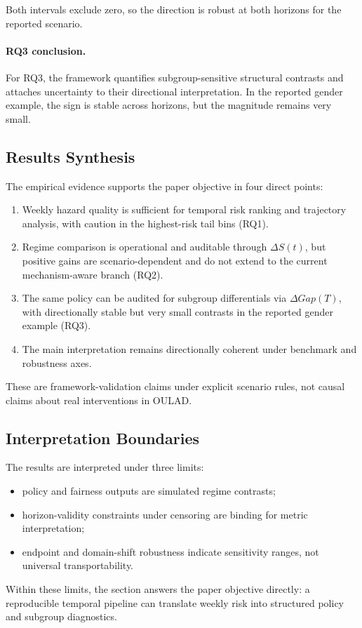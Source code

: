 Both intervals exclude zero, so the direction is robust at both horizons for the reported scenario.

\paragraph*{RQ3 conclusion.}
For RQ3, the framework quantifies subgroup-sensitive structural contrasts and attaches uncertainty to their directional interpretation. In the reported gender example, the sign is stable across horizons, but the magnitude remains very small.

\subsection{Results Synthesis}
\label{subsec:results_synthesis}

The empirical evidence supports the paper objective in four direct points:

\begin{enumerate}
\item Weekly hazard quality is sufficient for temporal risk ranking and trajectory analysis, with caution in the highest-risk tail bins (RQ1).
\item Regime comparison is operational and auditable through $\Delta S(t)$, but positive gains are scenario-dependent and do not extend to the current mechanism-aware branch (RQ2).
\item The same policy can be audited for subgroup differentials via $\Delta Gap(T)$, with directionally stable but very small contrasts in the reported gender example (RQ3).
\item The main interpretation remains directionally coherent under benchmark and robustness axes.
\end{enumerate}

These are framework-validation claims under explicit scenario rules, not causal claims about real interventions in OULAD.

\subsection{Interpretation Boundaries}

The results are interpreted under three limits:
\begin{itemize}
\item policy and fairness outputs are simulated regime contrasts;
\item horizon-validity constraints under censoring are binding for metric interpretation;
\item endpoint and domain-shift robustness indicate sensitivity ranges, not universal transportability.
\end{itemize}

Within these limits, the section answers the paper objective directly: a reproducible temporal pipeline can translate weekly risk into structured policy and subgroup diagnostics.